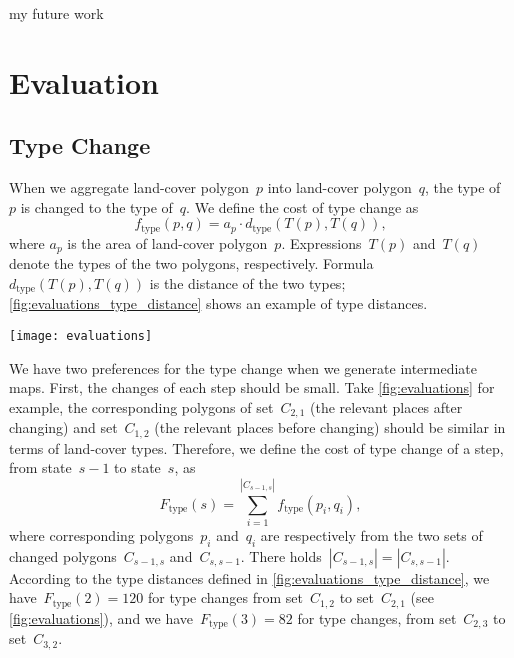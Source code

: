\documentclass[ijgi,article,submit,moreauthors,pdftex]{Definitions/mdpi}
\begin{document}
my future work

\section{Evaluation}

\subsection{Type Change}

When we aggregate land-cover polygon~$p$ into land-cover polygon~$q$,
the type of~$p$ is changed to the type of~$q$.  
We define the cost of type change as
\begin{equation}
\label{eq:f_type}
f_\mathrm{type}(p,q)=a_p \cdot d_\mathrm{type}(T(p),T(q)),
\end{equation}
where $a_p$ is the area of land-cover polygon~$p$. 
Expressions~$T(p)$ and~$T(q)$ denote the types of the two polygons, respectively.
Formula~$d_\mathrm{type}(T(p),T(q))$ is the distance of the two types;
\fig\ref{fig:evaluations_type_distance} shows an example of type distances.

\begin{figure*}[tb]
\centering
\texttt{[image: evaluations]}
\caption{An example of type distances of land-cover polygons, 
    where each color represents a type.
}
\label{fig:evaluations_type_distance}
\end{figure*}


We have two preferences for the type change when we generate intermediate maps.
First, the changes of each step should be small.
Take \fig\ref{fig:evaluations} for example, the corresponding polygons of
set~$C_{2,1}$ (the relevant places after  changing) and 
set~$C_{1,2}$ (the relevant places before changing)
should be similar in terms of land-cover types.
Therefore, we define the cost of type change of a step,
from state~$s-1$ to state~$s$, as
\begin{equation}
\label{eq:F_type}
F_\mathrm{type}(s)=\sum_{i=1}^{|C_{s-1,s}|} f_\mathrm{type}(p_i,q_i),
\end{equation}
where corresponding polygons~$p_i$ and~$q_i$ are respectively from 
the two sets of changed polygons~$C_{s-1,s}$ and~$C_{s,s-1}$.
There holds~$|C_{s-1,s}| = |C_{s,s-1}|$.
According to the type distances defined in \fig\ref{fig:evaluations_type_distance},
we have~$F_\mathrm{type}(2)=120$
for type changes from set~$C_{1,2}$ to set~$C_{2,1}$ 
(see \fig\ref{fig:evaluations}), and
we have~$F_\mathrm{type}(3)=82$
for type changes, from set~$C_{2,3}$ to set~$C_{3,2}$.
\end{document}
